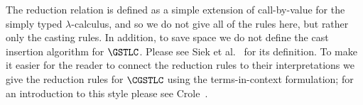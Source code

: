 The reduction relation is defined as a simple extension of
call-by-value for the simply typed $\lambda$-calculus, and so we do
not give all of the rules here, but rather only the casting rules.  In
addition, to save space we do not define the cast insertion algorithm
for $\GSTLC$.  Please see Siek et al.~\cite{Siek:2015} for its
definition.  To make it easier for the reader to connect the reduction
rules to their interpretations we give the reduction rules for
$\CGSTLC$ using the terms-in-context formulation; for an introduction
to this style please see Crole~\cite{Crole:1994}.

